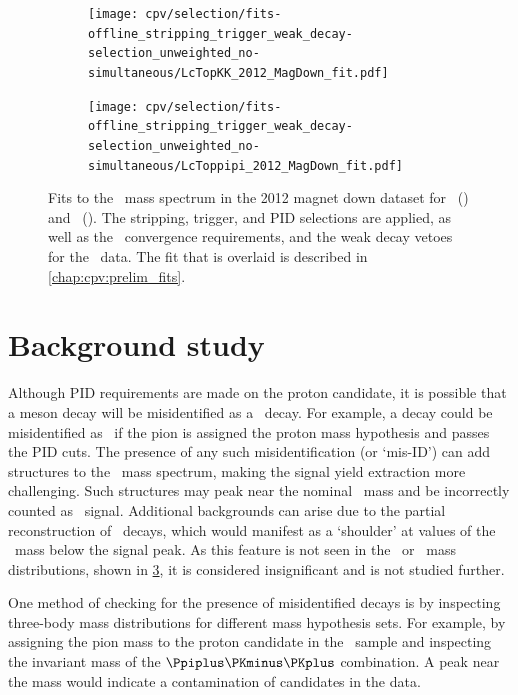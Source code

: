\begin{figure}
  \begin{subfigure}[b]{0.5\textwidth}
    \texttt{[image: cpv/selection/fits-offline\_stripping\_trigger\_weak\_decay-selection\_unweighted\_no-simultaneous/LcTopKK\_2012\_MagDown\_fit.pdf]}
    \caption{\pKK}
    \label{fig:cpv:selection:postpid:pKK}
  \end{subfigure}
  \begin{subfigure}[b]{0.5\textwidth}
    \texttt{[image: cpv/selection/fits-offline\_stripping\_trigger\_weak\_decay-selection\_unweighted\_no-simultaneous/LcToppipi\_2012\_MagDown\_fit.pdf]}
    \caption{\ppipi}
    \label{fig:cpv:selection:postpid:ppipi}
  \end{subfigure}
  \caption{%
    Fits to the \PLambdac\ mass spectrum in the 2012 magnet down dataset for
    \pKK\ () and \ppipi\
    ().
    The stripping, trigger, and \ac{PID} selections are applied, as well as the
    \decaytreefitter\ convergence requirements, and the weak decay vetoes for
    the \ppipi\ data.
    The fit that is overlaid is described in \cref{chap:cpv:prelim_fits}.
  }
  \label{fig:cpv:selection:postpid}
\end{figure}

\section{Background study}
\label{chap:cpv:selection:background_study}

Although \ac{PID} requirements are made on the proton candidate, it is possible
that a meson decay will be misidentified as a \PLambdac\ decay.
For example, a \decay{\PDsplus}{\PKminus\PKplus\Ppiplus} decay could be
misidentified as \LcTopKK\ if the pion is assigned the proton mass hypothesis
and passes the \ac{PID} cuts.
The presence of any such misidentification (or `mis-ID') can add structures to
the \PLambdac\ mass spectrum, making the signal yield extraction more
challenging.
Such structures may peak near the nominal \PLambdac\ mass and be incorrectly
counted as \PLambdac\ signal.
Additional backgrounds can arise due to the partial reconstruction of
\PLambdac\ decays, which would manifest as a `shoulder' at values of the
\PLambdac\ mass below the signal peak.
As this feature is not seen in the \pKK\ or \ppipi\ mass distributions, shown
in \cref{fig:cpv:selection:postpid}, it is considered insignificant and is not
studied further.

One method of checking for the presence of misidentified decays is by
inspecting three-body mass distributions for different mass hypothesis sets.
For example, by assigning the pion mass to the proton candidate in the \pKK\
sample and inspecting the invariant mass of the $\Ppiplus\PKminus\PKplus$
combination.
A peak near the \PDsplus mass would indicate a contamination of \PDsplus
candidates in the data.

